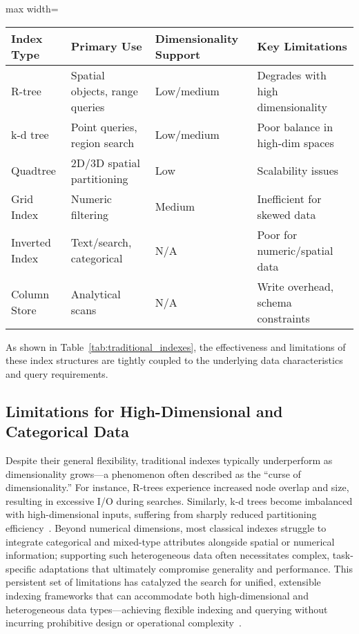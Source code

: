 \documentclass[sigconf]{acmart}
\begin{document}
\begin{table*}[htbp]
\centering
\caption{Comparison of traditional index structures by usage and limitations}
\label{tab:traditional_indexes}
\begin{adjustbox}{max width=\textwidth}
\begin{tabular}{llll}
\toprule
\textbf{Index Type} & \textbf{Primary Use} & \textbf{Dimensionality Support} & \textbf{Key Limitations} \\
\midrule
R-tree & Spatial objects, range queries & Low/medium & Degrades with high dimensionality \\
k-d tree & Point queries, region search & Low/medium & Poor balance in high-dim spaces \\
Quadtree & 2D/3D spatial partitioning & Low & Scalability issues \\
Grid Index & Numeric filtering & Medium & Inefficient for skewed data \\
Inverted Index & Text/search, categorical & N/A & Poor for numeric/spatial data \\
Column Store & Analytical scans & N/A & Write overhead, schema constraints \\
\bottomrule
\end{tabular}
\end{adjustbox}
\end{table*}

As shown in Table~\ref{tab:traditional_indexes}, the effectiveness and limitations of these index structures are tightly coupled to the underlying data characteristics and query requirements.

\subsection{Limitations for High-Dimensional and Categorical Data}

Despite their general flexibility, traditional indexes typically underperform as dimensionality grows—a phenomenon often described as the “curse of dimensionality.” For instance, R-trees experience increased node overlap and size, resulting in excessive I/O during searches. Similarly, k-d trees become imbalanced with high-dimensional inputs, suffering from sharply reduced partitioning efficiency~\cite{ref111,ref112}. Beyond numerical dimensions, most classical indexes struggle to integrate categorical and mixed-type attributes alongside spatial or numerical information; supporting such heterogeneous data often necessitates complex, task-specific adaptations that ultimately compromise generality and performance. This persistent set of limitations has catalyzed the search for unified, extensible indexing frameworks that can accommodate both high-dimensional and heterogeneous data types—achieving flexible indexing and querying without incurring prohibitive design or operational complexity~\cite{ref111,ref112}.
\end{document}
